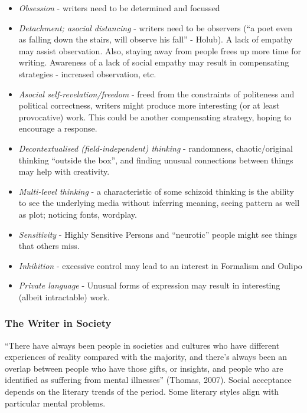\documentclass[11pt]{article}
\begin{document}
\begin{itemize}
\item        \textit{Obsession} - writers need to be determined and focussed
         \item \textit{Detachment; asocial distancing} - writers need to be observers (``a   poet even as falling down the stairs, will observe his fall''  - Holub). A lack of empathy may assist observation. Also, staying away from people frees up more time for writing. Awareness of a lack of social empathy may result in compensating strategies - increased observation, etc.
         \item  \textit{Asocial self-revelation/freedom} - freed from the constraints of politeness and political correctness, writers might produce more interesting (or at least provocative) work. This could be another compensating strategy, hoping to encourage a response.
         \item  \textit{Decontextualised (field-independent) thinking} - randomness, chaotic/original
thinking ``outside the box'', and finding unusual connections between things may help with creativity.
         \item  \textit{Multi-level thinking} - a characteristic of some schizoid thinking is the ability to see the underlying media without inferring meaning, seeing pattern as well as plot; noticing fonts, wordplay.
         \item  \textit{Sensitivity} - Highly Sensitive Persons and ``neurotic'' people might see things that others miss.
         \item  \textit{Inhibition} - excessive control may lead to an interest in Formalism and Oulipo
         \item  \textit{Private language} - Unusual forms of expression may result in interesting (albeit intractable) work.
\end{itemize}

\subsubsection*{The Writer in Society}

 ``There have always been people in societies and cultures who have different experiences of reality compared with the majority, and there's always been an overlap between people who have those gifts, or insights, and people who are identified as suffering from mental illnesses'' (Thomas, 2007). Social acceptance depends on the literary trends of the period. Some literary styles align with particular mental problems.
\end{document}
